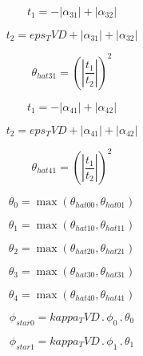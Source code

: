\documentclass{article}
\begin{document}
\begin{dmath}t_{1} = - \left|{\alpha_{31}}\right| + \left|{\alpha_{32}}\right|\end{dmath}

\begin{dmath}t_{2} = eps_TVD + \left|{\alpha_{31}}\right| + \left|{\alpha_{32}}\right|\end{dmath}

\begin{dmath}\theta_{hat 31} = \left(\left|{\frac{t_{1}}{t_{2}}}\right| \right)^{2}\end{dmath}

\begin{dmath}t_{1} = - \left|{\alpha_{41}}\right| + \left|{\alpha_{42}}\right|\end{dmath}

\begin{dmath}t_{2} = eps_TVD + \left|{\alpha_{41}}\right| + \left|{\alpha_{42}}\right|\end{dmath}

\begin{dmath}\theta_{hat 41} = \left(\left|{\frac{t_{1}}{t_{2}}}\right| \right)^{2}\end{dmath}

\begin{dmath}\theta_{0} = \max\left(\theta_{hat 00}, \theta_{hat 01}\right)\end{dmath}

\begin{dmath}\theta_{1} = \max\left(\theta_{hat 10}, \theta_{hat 11}\right)\end{dmath}

\begin{dmath}\theta_{2} = \max\left(\theta_{hat 20}, \theta_{hat 21}\right)\end{dmath}

\begin{dmath}\theta_{3} = \max\left(\theta_{hat 30}, \theta_{hat 31}\right)\end{dmath}

\begin{dmath}\theta_{4} = \max\left(\theta_{hat 40}, \theta_{hat 41}\right)\end{dmath}

\begin{dmath}\phi_{star 0} = kappa_TVD \,.\, \phi_{0} \,.\, \theta_{0}\end{dmath}

\begin{dmath}\phi_{star 1} = kappa_TVD \,.\, \phi_{1} \,.\, \theta_{1}\end{dmath}
\end{document}
